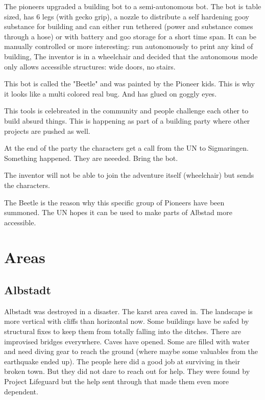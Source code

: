 The pioneers upgraded a building bot to a semi-autonomous bot. The bot is table sized, has 6 legs (with gecko grip), a nozzle to distribute a self hardening gooy substance for building and can either run tethered (power and substance comes through a hose) or with battery and goo storage for a short time span. It can be manually controlled or more interesting: run autonomously to print any kind of building, The inventor is in a wheelchair and decided that the autonomous mode only allows accessible structures: wide doors, no stairs.

This bot is called the "Beetle" and was painted by the Pioneer kids. This is why it looks like a multi colored real bug. And has glued on goggly eyes.

This tools is celebreated in the community and people challenge each other to build absurd things. This is happening as part of a building party where other projects are pushed as well.
 
At the end of the party the characters get a call from the UN to Sigmaringen. Something happened. They are neeeded. Bring the bot.

The inventor will not be able to join the adventure itself (wheelchair) but sends the characters.

The Beetle is the reason why this specific group of Pioneers have been summoned. The UN hopes it can be used to make parts of Albstad more accessible.

\section{Areas}

\subsection{Albstadt}

Albstadt was destroyed in a disaster. The karst area caved in. The landscape is more vertical with cliffs than horizontal now. Some buildings have be safed by structural fixes to keep them from totally falling into the ditches. There are improvised bridges everywhere. Caves have opened. Some are filled with water and need diving gear to reach the ground (where maybe some valuables from the earthquake ended up).
The people here did a good job at surviving in their broken town. But they did not dare to reach out for help. They were found by Project Lifeguard but the help sent through that made them even more dependent.

